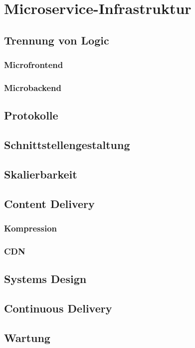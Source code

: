 \chapter{Microservice-Infrastruktur}

\section{Trennung von Logic}

\subsection{Microfrontend}

\subsection{Microbackend}

\section{Protokolle}

\section{Schnittstellengestaltung}

\section{Skalierbarkeit}

\section{Content Delivery}

\subsection{Kompression}
\subsection{CDN}

\section{Systems Design}

\section{Continuous Delivery}

\section{Wartung}

